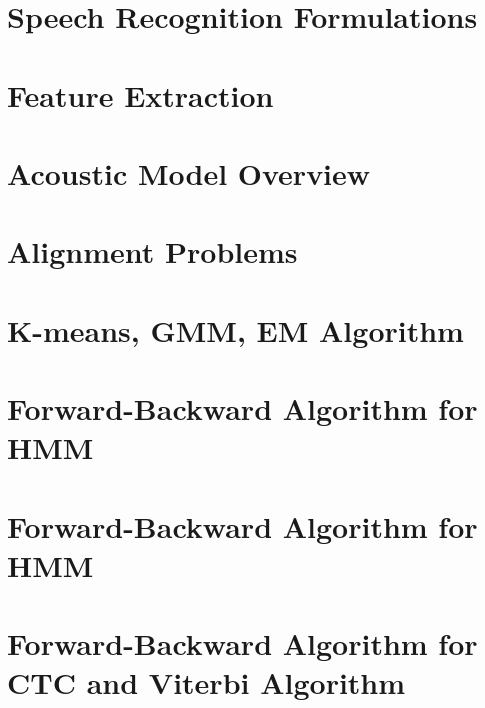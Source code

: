 \documentclass[a4paper]{article}
\begin{document}
\section{Speech Recognition Formulations}


\section{Feature Extraction}


\section{Acoustic Model Overview}


\section{Alignment Problems}


\section{K-means, GMM, EM Algorithm}


\section{Forward-Backward Algorithm for HMM}


\section{Forward-Backward Algorithm for HMM}


\section{Forward-Backward Algorithm for CTC and Viterbi Algorithm}

\end{document}

